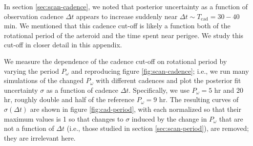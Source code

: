 \documentclass[fleqn,usenatbib]{mnras}
\begin{document}
In section \ref{sec:scan-cadence}, we noted that posterior uncertainty as a function of observation cadence $\Delta t$ appears to increase suddenly near $\Delta t \sim T_\text{cad}=30-40$ min. We mentioned that this cadence cut-off is likely a function both of the rotational period of the asteroid and the time spent near perigee. We study this cut-off in closer detail in this appendix.

We measure the dependence of the cadence cut-off on rotational period by varying the period $P_\omega$ and reproducing figure \ref{fig:scan-cadence}; i.e., we run many simulations of the changed $P_\omega$ with different cadences and plot the posterior fit uncertainty $\sigma$ as a function of cadence $\Delta t$. Specifically, we use $P_\omega = 5$ hr and 20 hr, roughly double and half of the reference $P_\omega=9$ hr. The resulting curves of $\sigma(\Delta t)$ are shown in figure \ref{fig:cad-period}, with each normalized so that their maximum values is 1 so that changes to $\sigma$ induced by the change in $P_\omega$ that are not a function of $\Delta t$ (i.e., those studied in section \ref{sec:scan-period}), are removed; they are irrelevant here.
\end{document}
